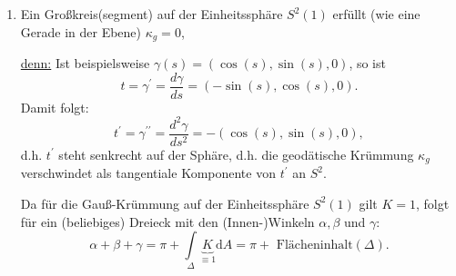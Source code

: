 \documentclass[a4paper,11pt,notitlepage]{report}
\theoremstyle{definition}
\begin{document}
\begin{enumerate}
\item Ein Großkreis(segment) auf der Einheitssphäre $S^2(1)$ erfüllt (wie eine Gerade in der Ebene) $\kappa_g = 0$,

\underline{denn:} Ist beispielsweise $\gamma(s) = (\cos (s), \sin(s), 0)$, so ist
$$t = \gamma^\prime = \frac{d \gamma}{d s} = (- \sin(s), \cos(s), 0).$$
Damit folgt:
$$t^\prime = \gamma^{\prime \prime} = \frac{d^2 \gamma}{ds^2} = -(\cos(s), \sin(s), 0),$$
d.h. $t^\prime$ steht senkrecht auf der Sphäre, d.h. die geodätische Krümmung $\kappa_g$ verschwindet als tangentiale Komponente von $t^\prime$ an $S^2$.

Da für die Gauß-Krümmung auf der Einheitssphäre $S^2(1)$ gilt $K=1$, folgt für ein (beliebiges) Dreieck mit den (Innen-)Winkeln $\alpha, \beta$ und $\gamma$:
$$\alpha + \beta + \gamma = \pi + \int\limits_\Delta \underbrace{K}_{\equiv 1} \mathrm{d} A = \pi + \text{ Flächeninhalt}(\Delta).$$

\end{enumerate}
\end{document}

